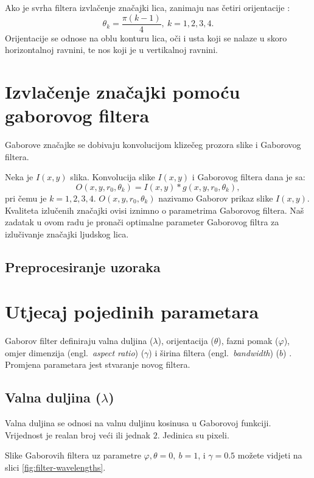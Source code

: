 \documentclass{article}
\newcommand{\engl}[1]{(engl.~\emph{#1})}
\begin{document}
Ako je svrha filtera izvlačenje značajki lica, zanimaju nas četiri orijentacije
\citep{huang2005robust}:
\begin{equation}
\theta_k = \frac{\pi(k-1)}{4},\: k = 1,2,3,4.
\label{equ:orijentacije}
\end{equation}
Orijentacije se odnose na oblu konturu lica, oči i usta koji se nalaze u skoro
horizontalnoj ravnini, te nos koji je u vertikalnoj ravnini.

\section{Izvlačenje značajki pomoću gaborovog filtera}
Gaborove značajke se dobivaju konvolucijom klizečeg prozora slike i Gaborovog
filtera.

Neka je $I(x,y)$ slika. Konvolucija slike $I(x,y)$ i Gaborovog filtera dana je
sa:
\begin{equation}
O(x,y,r_0, \theta_k) = I(x,y) * g(x,y,r_0, \theta_k),
\label{konvolucija-filter-slika}
\end{equation}
pri čemu je $k = 1, 2, 3, 4$. $O(x,y,r_0, \theta_k)$ nazivamo Gaborov prikaz
slike $I(x,y)$.
Kvaliteta izlučenih značajki ovisi iznimno o parametrima Gaborovog filtera.
Naš zadatak u ovom radu je pronači optimalne parameter Gaborovog filtra za izlučivanje
značajki ljudskog lica.

\subsection{Preprocesiranje uzoraka}

\section{Utjecaj pojedinih parametara}
Gaborov filter definiraju valna duljina ($\lambda$),
orijentacija ($\theta$), fazni pomak ($\varphi$), omjer dimenzija \engl{aspect ratio}
($\gamma $) i širina filtera \engl{bandwidth} ($b$) \citep{petkovgabor}.
Promjena parametara jest stvaranje novog filtera.

\subsection{Valna duljina ($\lambda$)}
Valna duljina se odnosi na valnu duljinu kosinusa u Gaborovoj funkciji.
Vrijednost je realan broj veći ili jednak $2$. Jedinica su pixeli.

Slike Gaborovih filtera uz parametre $\varphi, \theta = 0,\: b = 1$, i $\gamma =
0.5$ možete vidjeti na slici \ref{fig:filter-wavelengths}.
\end{document}
